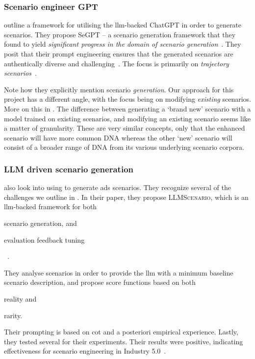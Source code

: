 \subsubsection{Scenario engineer GPT}

\citeauthor{seGpt} outline a framework for utilising the \acrshort{llm}-backed ChatGPT in order to
generate scenarios. They propose SeGPT -- a scenario generation framework that they found to yield
\textit{significant progress in the domain of scenario generation}~\cite[4422]{seGpt}. They posit
that their prompt engineering ensures that the generated scenarios are authentically diverse and
challenging~\cite[4423]{seGpt}. The focus is primarily on \textit{trajectory
    scenarios}~\cite[4422-4423]{seGpt}.

Note how they explicitly mention scenario \textit{generation}. Our approach for this project has a
different angle, with the focus being on modifying \textit{existing} scenarios. More on this in
. The difference between generating a `brand new' scenario with a model
trained on existing scenarios, and modifying an existing scenario seems like a matter of
granularity. These are very similar concepts, only that the enhanced scenario will have more common
DNA whereas the other `new' scenario will consist of a broader range of DNA from its various
underlying scenario corpora.

\subsubsection{LLM driven scenario generation}\label{sec:rwChang24}

\citeauthor{LLMScenarioChang24} also look into using  to generate \acrshort{ads}
scenarios. They recognize several of the challenges we outline in . In
their \citeyear{LLMScenarioChang24} paper, they propose \textsc{LLMScenario}, which is an
\acrshort{llm}-backed framework for both \begin{inparaenum}
    \item scenario generation, and
    \item  evaluation feedback tuning
\end{inparaenum}~\cite[6581]{LLMScenarioChang24}.

They analyse scenarios in order to provide the \acrshort{llm} with a minimum baseline scenario
description, and propose score functions based on both \begin{inparaenum}
    \item reality and
    \item rarity.
\end{inparaenum} Their prompting is based on \acrfull{cot} and a posteriori empirical experience.
Lastly, they tested several  for their experiments. Their results were positive,
indicating effectiveness for scenario engineering in Industry 5.0~\cite[6581]{LLMScenarioChang24}.

